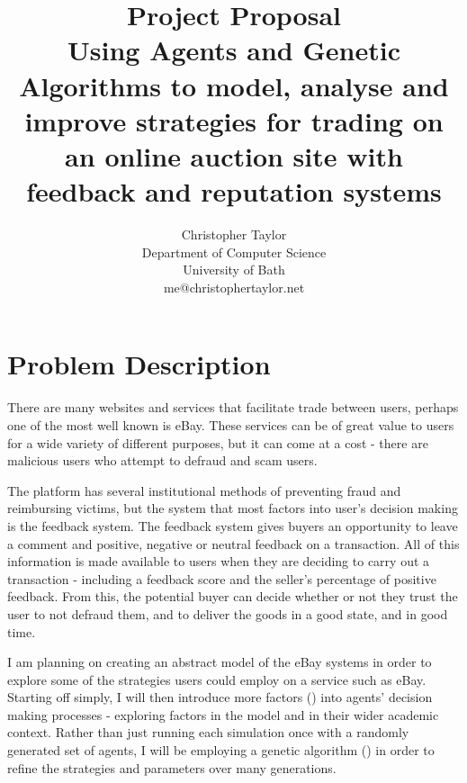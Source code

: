 \documentclass{article}
\title{Project Proposal \\ Using Agents and Genetic Algorithms to model, analyse and improve strategies for trading on an online auction site with feedback and reputation systems}
\author{Christopher Taylor \\ Department of Computer Science \\ University of Bath \\ me@christophertaylor.net}
\begin{document}
\maketitle
{}
\listoftodos
\section{Problem Description}
\label{sec:problem-description}
There are many websites and services that facilitate trade between users, perhaps one of the most well known is eBay. These services can be of great value to users for a wide variety of different purposes, but it can come at a cost - there are malicious users who attempt to defraud and scam users.

The platform has several institutional methods of preventing fraud and reimbursing victims, but the system that most factors into user's decision making is the feedback system. The feedback system gives buyers an opportunity to leave a comment and positive, negative or neutral feedback on a transaction. All of this information is made available to users when they are deciding to carry out a transaction - including a feedback score and the seller's percentage of positive feedback. From this, the potential buyer can decide whether or not they trust the user to not defraud them, and to deliver the goods in a good state, and in good time.

I am planning on creating an abstract model of the eBay systems in order to explore some of the strategies users could employ on a service such as eBay. Starting off simply, I will then introduce more factors () into agents' decision making processes - exploring factors in the model and in their wider academic context. Rather than just running each simulation once with a randomly generated set of agents, I will be employing a genetic algorithm () in order to refine the strategies and parameters over many generations.
\end{document}
